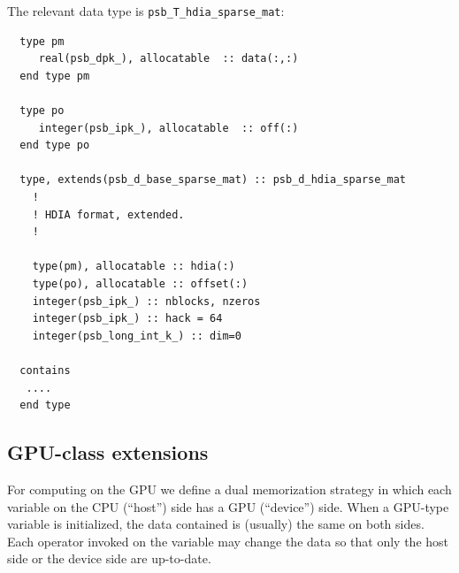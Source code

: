 The relevant data type is \verb|psb_T_hdia_sparse_mat|:
\begin{verbatim}
  type pm
     real(psb_dpk_), allocatable  :: data(:,:)
  end type pm

  type po
     integer(psb_ipk_), allocatable  :: off(:)
  end type po

  type, extends(psb_d_base_sparse_mat) :: psb_d_hdia_sparse_mat
    !
    ! HDIA format, extended.
    !
    
    type(pm), allocatable :: hdia(:)
    type(po), allocatable :: offset(:)
    integer(psb_ipk_) :: nblocks, nzeros
    integer(psb_ipk_) :: hack = 64
    integer(psb_long_int_k_) :: dim=0

  contains
   ....
  end type
\end{verbatim}



\subsection{GPU-class extensions}

For computing on the GPU we define a dual memorization strategy in
which each variable on the CPU (``host'') side has a GPU (``device'')
side. When a GPU-type variable is initialized, the data contained is
(usually) the same on both sides. Each operator invoked on the
variable may change the data so that only the host side or the device
side are up-to-date. 


